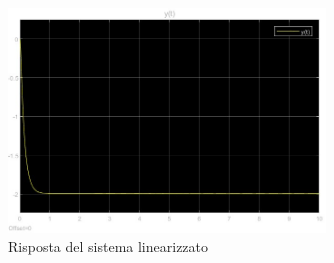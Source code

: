 \documentclass[a4paper, 11pt]{article}
\begin{document}
\begin{figure}[H]
    \centering
    \includegraphics[width=0.75\textwidth]{immagini/risposta_sistema_a_tutti_gli_ingressi.jpg}
    \caption{Risposta del sistema linearizzato}
    \label{risposta_sys_linearizzato}
\end{figure}
\end{document}
